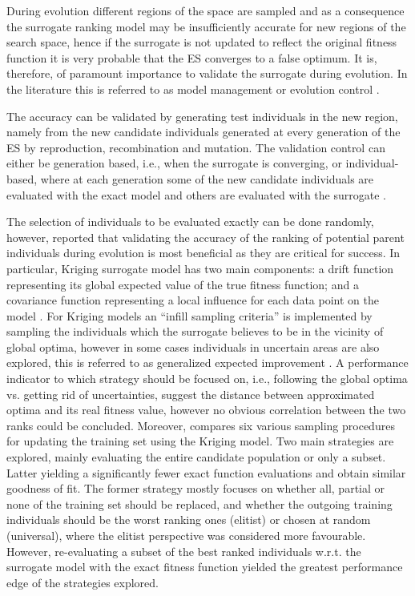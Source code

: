 During evolution different regions of the space are sampled and as a consequence the surrogate ranking model may be insufficiently accurate for new regions of the search space, hence if the surrogate is not updated to reflect the original fitness function it is very probable that the ES converges to a false optimum. It is, therefore, of paramount importance to validate the surrogate during evolution. In the literature this is referred to as model management or evolution control \citep[cf.][]{Jin05}.

The accuracy can be validated by generating test individuals  in the new region, namely from the new candidate individuals generated at every generation of the ES by reproduction, recombination and mutation. The validation control can either be generation based, i.e.,  when the surrogate is converging, or individual-based, where  at each generation some of the new candidate individuals are evaluated with the exact model and others are evaluated with the surrogate \citep[cf.][]{Jin05}. 

The selection of individuals  to be evaluated exactly can be done randomly, however, \cite{Ru04:PPSN} reported that validating the accuracy of the ranking of potential parent individuals  during evolution is most beneficial as they are critical for success.  %
In particular, Kriging surrogate model has two main components: a drift function representing its global expected value of the true fitness function; and a covariance function representing a local influence for each data point on the model \citep[cf.][]{Ratle99}. %
For Kriging models an ``infill sampling criteria'' is implemented by sampling the individuals  which the surrogate believes to be in the vicinity of global optima, however in some cases individuals  in uncertain areas are also explored, this is referred to as generalized expected improvement \citep{Sasena02}. A performance indicator to which strategy should be focused on, i.e.,  following the global optima vs. getting rid of uncertainties, \cite{Ponweiser08} suggest the distance between approximated optima and its real fitness value, however no obvious correlation between the two ranks could be concluded. Moreover, \cite{Ratle99} compares six various sampling procedures for updating the training set using the Kriging model. Two main strategies are explored, mainly evaluating the entire candidate population or only a subset. Latter yielding a significantly fewer exact function evaluations and obtain similar goodness of fit. The former strategy mostly focuses on whether all, partial or none of the training set should be replaced, and whether the outgoing training individuals  should be the worst ranking ones (elitist) or chosen at random (universal), where the elitist perspective was considered more favourable. However, re-evaluating a subset of the best ranked individuals  w.r.t. the surrogate model with the exact fitness function yielded the greatest performance edge of the strategies explored. 

